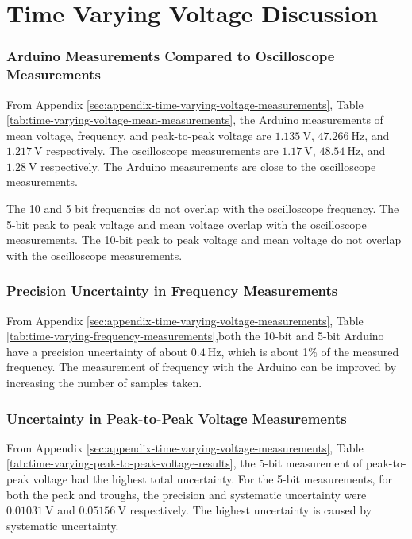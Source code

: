 \section{Time Varying Voltage Discussion}
\subsubsection{Arduino Measurements Compared to Oscilloscope Measurements}
\noindent From Appendix \ref{sec:appendix-time-varying-voltage-measurements}, Table \ref{tab:time-varying-voltage-mean-measurements},
the Arduino measurements of mean voltage, frequency, and peak-to-peak voltage are $\qty{1.135}{\volt}$, $\qty{47.266}{\hertz}$, and $\qty{1.217}{\volt}$ respectively.
The oscilloscope measurements are $\qty{1.17}{\volt}$, $\qty{48.54}{\hertz}$, and $\qty{1.28}{\volt}$ respectively. The Arduino measurements are close 
to the oscilloscope measurements. 

The 10 and 5 bit frequencies do not overlap with the oscilloscope frequency. The 5-bit peak to peak voltage and mean voltage overlap with the oscilloscope measurements.
The 10-bit peak to peak voltage and mean voltage do not overlap with the oscilloscope measurements.

\subsubsection{Precision Uncertainty in Frequency Measurements}
\noindent From Appendix \ref{sec:appendix-time-varying-voltage-measurements}, Table \ref{tab:time-varying-frequency-measurements},both the 10-bit 
and 5-bit Arduino have a precision uncertainty of about $\qty{0.4}{\hertz}$, which is about 1\% of the measured frequency. 
The measurement of frequency with the Arduino can be improved by increasing the number of samples taken.

\subsubsection{Uncertainty in Peak-to-Peak Voltage Measurements}
\noindent From Appendix \ref{sec:appendix-time-varying-voltage-measurements}, Table \ref{tab:time-varying-peak-to-peak-voltage-results}, 
the 5-bit measurement of peak-to-peak voltage had the highest total uncertainty. For the 5-bit measurements, for both the peak and troughs, 
the precision and systematic uncertainty were $\qty{0.01031}{\volt}$ and $\qty{0.05156}{\volt}$ respectively. The highest uncertainty is caused by 
systematic uncertainty.

